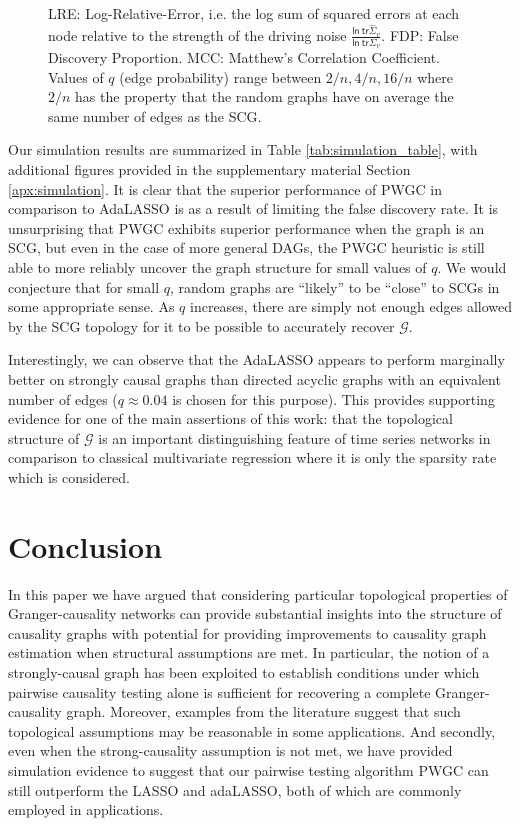 \documentclass{statsoc}
\def\gcg{\mathcal{G}}  %
\def\ln{\mathsf{ln\ }}  %
\def\tr{\mathsf{tr }}  %
\begin{document}
\begin{figure}[!h]
{    LRE: Log-Relative-Error, i.e. the log sum of squared errors at
    each node relative to the strength of the driving noise
    $\frac{\ln \tr \widehat{\Sigma}_v}{\ln \tr \Sigma_v}$.  FDP: False
    Discovery Proportion.  MCC: Matthew's Correlation Coefficient.\\

    Values of $q$ (edge probability) range between
    $2 / n, 4 / n, 16 / n$ where $2 / n$ has the property that the
    random graphs have on average the same number of edges as the
    SCG.}
\end{figure}

Our simulation results are summarized in Table
\ref{tab:simulation_table}, with additional figures provided in the
supplementary material Section \ref{apx:simulation}.  It is clear that
the superior performance of PWGC in comparison to AdaLASSO is as a
result of limiting the false discovery rate.  It is unsurprising that
PWGC exhibits superior performance when the graph is an SCG, but even
in the case of more general DAGs, the PWGC heuristic is still able to
more reliably uncover the graph structure for small values of $q$.  We
would conjecture that for small $q$, random graphs are ``likely'' to
be ``close'' to SCGs in some appropriate sense.  As $q$ increases,
there are simply not enough edges allowed by the SCG topology for it
to be possible to accurately recover $\gcg$.

Interestingly, we can observe that the AdaLASSO appears to perform
marginally better on strongly causal graphs than directed acyclic
graphs with an equivalent number of edges ($q \approx 0.04$ is chosen for
this purpose).  This provides supporting evidence for one of the main
assertions of this work: that the topological structure of $\gcg$ is
an important distinguishing feature of time series networks in
comparison to classical multivariate regression where it is only the
sparsity rate which is considered.

\section{Conclusion}
\label{sec:conclusion}
In this paper we have argued that considering particular topological
properties of Granger-causality networks can provide substantial
insights into the structure of causality graphs with potential for
providing improvements to causality graph estimation when structural
assumptions are met.  In particular, the notion of a strongly-causal
graph has been exploited to establish conditions under which pairwise
causality testing alone is sufficient for recovering a complete
Granger-causality graph.  Moreover, examples from the literature
suggest that such topological assumptions may be reasonable in some
applications.  And secondly, even when the strong-causality assumption
is not met, we have provided simulation evidence to suggest that our
pairwise testing algorithm PWGC can still outperform the LASSO and
adaLASSO, both of which are commonly employed in applications.
\end{document}
